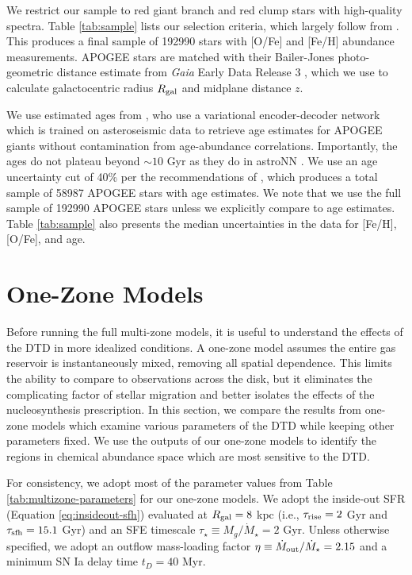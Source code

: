 \documentclass[twocolumn,twocolappendix,linenumbers]{aastex631}
\newcommand{\samplesize}{\num{192990}\xspace}
\newcommand{\agesamplesize}{\num{58987}\xspace}
\begin{document}
We restrict our sample to red giant branch and red clump stars with high-quality spectra. Table \ref{tab:sample} lists our selection criteria, which largely follow from \citet{Hayden2015-ChemicalCartography}. This produces a final sample of \samplesize stars with [O/Fe] and [Fe/H] abundance measurements. APOGEE stars are matched with their Bailer-Jones photo-geometric distance estimate from \textit{Gaia} Early Data Release 3 \citep{Gaia2016-Mission,Gaia2021-EDR3}, which we use to calculate galactocentric radius $R_{\rm gal}$ and midplane distance $z$.

We use estimated ages from \citet[][hereafter ]{Leung2023-Ages}, who use a variational encoder-decoder network which is trained on asteroseismic data to retrieve age estimates for APOGEE giants without contamination from age-abundance correlations. Importantly, the  ages do not plateau beyond $\sim10$ Gyr as they do in astroNN \citep{Mackereth2019-astroNN-Ages}. We use an age uncertainty cut of 40\% per the recommendations of , which produces a total sample of \agesamplesize APOGEE stars with age estimates. We note that we use the full sample of \samplesize APOGEE stars unless we explicitly compare to age estimates. Table \ref{tab:sample} also presents the median uncertainties in the data for [Fe/H], [O/Fe], and age.

\section{One-Zone Models}
\label{sec:onezone-results}

Before running the full multi-zone models, it is useful to understand the effects of the DTD in more idealized conditions. A one-zone model assumes the entire gas reservoir is instantaneously mixed, removing all spatial dependence. This limits the ability to compare to observations across the disk, but it eliminates the complicating factor of stellar migration and better isolates the effects of the nucleosynthesis prescription. In this section, we compare the results from one-zone models which examine various parameters of the DTD while keeping other parameters fixed. We use the outputs of our one-zone models to identify the regions in chemical abundance space which are most sensitive to the DTD.

For consistency, we adopt most of the parameter values from Table \ref{tab:multizone-parameters} for our one-zone models.
We adopt the inside-out SFR (Equation \ref{eq:insideout-sfh}) evaluated at $R_{\rm gal}=8$ kpc (i.e., $\tau_{\rm rise}=2$ Gyr and $\tau_{\rm sfh}=15.1$ Gyr) and an SFE timescale $\tau_\star\equiv M_g/\dot M_\star=2$ Gyr. Unless otherwise specified, we adopt an outflow mass-loading factor $\eta\equiv \dot M_{\rm out}/\dot M_\star=2.15$  and a minimum SN Ia delay time $t_D=40$ Myr. 
\end{document}
